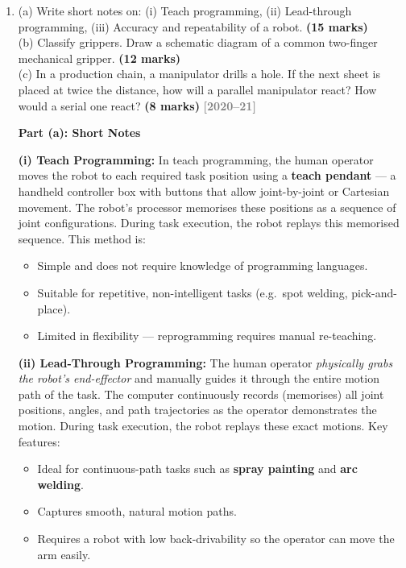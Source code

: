 \documentclass[12pt,a3paper]{article}
\newcommand{\yr}[1]{\hfill\textcolor{gray}{\small\textbf{[#1]}}}
\newcommand{\mk}[1]{\textcolor{orange!70!black}{\small\textbf{(#1 marks)}}}
\begin{document}
\begin{enumerate}
\item \label{qlabel:C1-Q1}
(a) Write short notes on: (i) Teach programming, (ii) Lead-through programming, (iii) Accuracy and repeatability of a robot. \mk{15}\\
(b) Classify grippers. Draw a schematic diagram of a common two-finger mechanical gripper. \mk{12}\\
(c) In a production chain, a manipulator drills a hole. If the next sheet is placed at twice the distance, how will a parallel manipulator react? How would a serial one react? \mk{8}
\yr{2020--21}

\begin{tcolorbox}[enhanced,breakable,ansbox,colback=cA!4,colframe=cA,
  boxrule=0.8pt,arc=5pt,
  title={\textbf{Answer}},fonttitle=\bfseries\color{white},colbacktitle=cA]

\textbf{Part (a): Short Notes}

\textbf{(i) Teach Programming:}
In teach programming, the human operator moves the robot to each required
task position using a \textbf{teach pendant} — a handheld controller box with
buttons that allow joint-by-joint or Cartesian movement. The robot's processor
memorises these positions as a sequence of joint configurations. During task
execution, the robot replays this memorised sequence. This method is:
\begin{itemize}[leftmargin=1.5em,itemsep=1pt]
  \item Simple and does not require knowledge of programming languages.
  \item Suitable for repetitive, non-intelligent tasks (e.g.\ spot welding,
        pick-and-place).
  \item Limited in flexibility — reprogramming requires manual re-teaching.
\end{itemize}

\textbf{(ii) Lead-Through Programming:}
The human operator \emph{physically grabs the robot's end-effector} and
manually guides it through the entire motion path of the task. The computer
continuously records (memorises) all joint positions, angles, and path
trajectories as the operator demonstrates the motion. During task execution,
the robot replays these exact motions. Key features:
\begin{itemize}[leftmargin=1.5em,itemsep=1pt]
  \item Ideal for continuous-path tasks such as \textbf{spray painting} and
        \textbf{arc welding}.
  \item Captures smooth, natural motion paths.
  \item Requires a robot with low back-drivability so the operator can move
        the arm easily.
\end{itemize}


\end{tcolorbox}
\end{enumerate}
\end{document}
